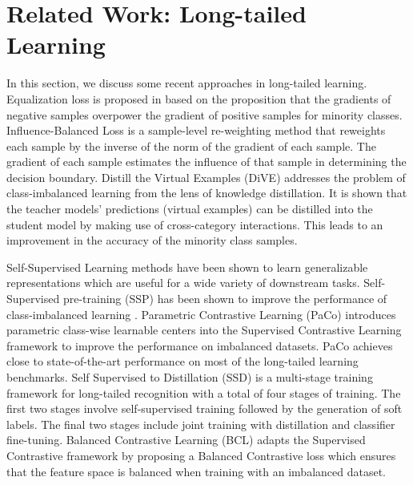 \documentclass{article}
\begin{document}
    








\section{Related Work: Long-tailed Learning}
\label{app:related_work}
In this section, we discuss some recent approaches in long-tailed learning. Equalization loss is proposed in \citet{tan2020equalization} based on the proposition that the gradients of negative samples overpower the gradient of positive samples for minority classes. Influence-Balanced Loss \cite{Park_2021_ICCV} is a sample-level re-weighting method that reweights each sample by the inverse of the norm of the gradient of each sample. The gradient of each sample estimates the influence of that sample in determining the decision boundary. Distill the Virtual Examples (DiVE) \cite{He_2021_ICCV} addresses the problem of class-imbalanced learning from the lens of knowledge distillation. It is shown that the teacher models' predictions (virtual examples) can be distilled into the student model by making use of cross-category interactions. This leads to an improvement in the accuracy of the minority class samples. 

\vspace{1mm}\noindent Self-Supervised Learning methods have been shown to learn generalizable representations \cite{chen2020simple} which are useful for a wide variety of downstream tasks. Self-Supervised pre-training (SSP) has been shown to improve the performance of class-imbalanced learning \cite{NEURIPS2020_e025b627}. Parametric Contrastive Learning (PaCo) \cite{cui2021parametric} introduces parametric class-wise learnable centers into the Supervised Contrastive Learning \cite{khosla2020supervised} framework to improve the performance on imbalanced datasets. PaCo achieves close to state-of-the-art performance on most of the long-tailed learning benchmarks. Self Supervised to Distillation (SSD) \cite{li2021self} is a multi-stage training framework for long-tailed recognition with a total of four stages of training. The first two stages involve self-supervised training followed by the generation of soft labels. The final two stages include joint training with distillation and classifier fine-tuning. Balanced Contrastive Learning (BCL) \cite{Zhu_2022_CVPR} adapts the Supervised Contrastive framework \cite{khosla2020supervised} by proposing a Balanced Contrastive loss which ensures that the feature space is balanced when training with an imbalanced dataset.
\end{document}
